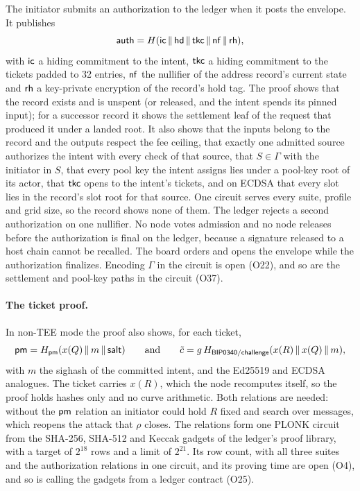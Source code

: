 The initiator submits an authorization to the ledger when it posts the envelope. It publishes
\[
  \mathsf{auth} = H(\mathsf{ic} \,\|\, \mathsf{hd} \,\|\, \mathsf{tkc} \,\|\, \mathsf{nf} \,\|\, \mathsf{rh}),
\]
with $\mathsf{ic}$ a hiding commitment to the intent, $\mathsf{tkc}$ a hiding commitment to the tickets padded to 32 entries, $\mathsf{nf}$ the nullifier of the address record's current state and $\mathsf{rh}$ a key-private encryption of the record's hold tag. The proof shows that the record exists and is unspent (or released, and the intent spends its pinned input); for a successor record it shows the settlement leaf of the request that produced it under a landed root. It also shows that the inputs belong to the record and the outputs respect the fee ceiling, that exactly one admitted source authorizes the intent with every check of that source, that $S \in \Gamma$ with the initiator in $S$, that every pool key the intent assigns lies under a pool-key root of its actor, that $\mathsf{tkc}$ opens to the intent's tickets, and on ECDSA that every slot lies in the record's slot root for that source. One circuit serves every suite, profile and grid size, so the record shows none of them. The ledger rejects a second authorization on one nullifier. No node votes admission and no node releases before the authorization is final on the ledger, because a signature released to a host chain cannot be recalled. The board orders and opens the envelope while the authorization finalizes. Encoding $\Gamma$ in the circuit is open (O22), and so are the settlement and pool-key paths in the circuit (O37).

\paragraph{The ticket proof.} In non-TEE mode the proof also shows, for each ticket,
\[
  \mathsf{pm} = H_{\mathsf{pm}}(x(Q) \,\|\, m \,\|\, \mathsf{salt}) \qquad\text{and}\qquad \tilde{c} = g\,H_{\mathsf{BIP0340/challenge}}(x(R) \,\|\, x(Q) \,\|\, m),
\]
with $m$ the sighash of the committed intent, and the Ed25519 and ECDSA analogues. The ticket carries $x(R)$, which the node recomputes itself, so the proof holds hashes only and no curve arithmetic. Both relations are needed: without the $\mathsf{pm}$ relation an initiator could hold $R$ fixed and search over messages, which reopens the attack that $\rho$ closes. The relations form one PLONK circuit from the SHA-256, SHA-512 and Keccak gadgets of the ledger's proof library, with a target of $2^{18}$ rows and a limit of $2^{21}$. Its row count, with all three suites and the authorization relations in one circuit, and its proving time are open (O4), and so is calling the gadgets from a ledger contract (O25).

